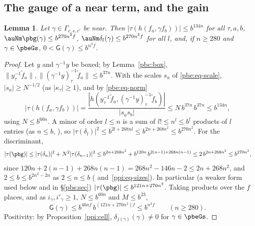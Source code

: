 \documentclass[10pt]{amsart}
\newtheorem{lemma}[theorem]{Lemma}
\theoremstyle{definition}
\theoremstyle{remark}
\begin{document}
\subsection{The gauge of a near term, and the gain}\label{ppi:ss-gain}

\begin{lemma}\label{ppi:gauge}
Let $\gamma\in\Gamma_{c,s,c'}$ be near. Then $|\tau(h(f_a,\gamma f_b))|\le b^{134n}$ for all $\tau,a,b$,
$\auNm\pbg(\gamma)\le b^{270n^2f}$, $\auNm\delta_l(\gamma)\le b^{270n^2f}$ for all $l$, and, if
$n\ge280$ and $\gamma\in\pbeGs$, $0<\mathsf G(\gamma)\le b^{n^3f}$.
\end{lemma}
\begin{proof}
Let $y$ and $\gamma^{-1}y$ be boxed; by Lemma~\ref{pbc:box}, $\|y_\tau^{-1}\tilde f_a\|,\|(\gamma^{-1}y)_\tau^{-1}\tilde f_a\|\le b^{37n}$. With the scales $s_a$ of \eqref{pbe:eq-scale}, $|s_a|\ge
N^{-1/2}$ (as $|\kappa_\tau|\ge1$), and by \eqref{pbe:eq-norm}
\[
|\tau(h(f_a,\gamma f_b))|=\frac{|h(y_\tau^{-1}\tilde f_a,(\gamma^{-1}y)_\tau^{-1}\tilde f_b)|}{|s_as_b|}
\le N\,b^{37n}\,b^{37n}\le b^{134n},
\]
using $N\le b^{60n}$. A minor of order $l\le n$ is a sum of $l!\le n^l\le b^l$ products of $l$
entries (as $n\le b$, {\cite[Lemma~13.4(S7)(e)]{P46}}), so $|\tau(\delta_l)|^2\le b^{2l+268nl}\le b^{2n+268n^2}\le b^{270n^2}$. For the discriminant,
\[
|\tau(\pbg)|\le|\tau(\delta_n)|^2+N^2|\tau(\delta_{n-1})|^2\le b^{2n+268n^2}+b^{120n}\,b^{2(n-1)+268n(n-1)}
\le2\,b^{2n+268n^2}\le b^{270n^2},
\]
since $120n+2(n-1)+268n(n-1)=268n^2-146n-2\le2n+268n^2$, and $2\le b\le b^{2n^2-2n}$ as $2\le n\le b$
({\cite[Lemma~13.4(S7)(e)]{P46}} and~\eqref{ppi:eq-sizes}). In particular (a weaker form used below and in \S\ref{pbs:sec}) $|\tau(\pbg)|\le b^{121n+270n^2}$. Taking products over the $f$ places,
and as $i_\gamma,i'_\gamma\ge1$, $N\le b^{60n}$ and $M\le b^{23}$,
\[
\mathsf G(\gamma)\le b^{46nf}\,b^{(121n+270n^2)f}\le b^{n^3f}\qquad(n\ge280).
\]
Positivity: by Proposition~\ref{ppi:cell}, $\delta_{j(\gamma)}(\gamma)\ne0$ for $\gamma\in\pbeGs$.
\end{proof}
\end{document}

